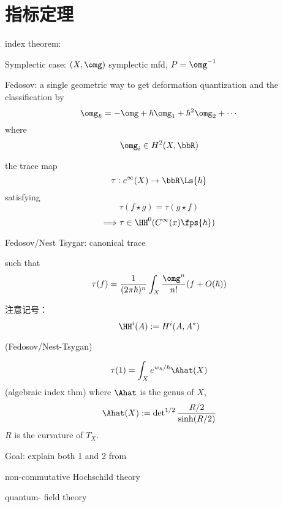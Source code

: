 

\section{指标定理}
index theorem:

Symplectic case: $(X,\omg)$ symplectic mfd,
$P=\omg^{-1}$

Fedosov: a single geometric way
to get deformation quantization and the classification by
$$\omg_{\hbar}=-\omg+\hbar\omg_1+\hbar^2\omg_2+\cdots$$
where
$$\omg_i\in H^2(X,\bbR)$$

\begin{definition}
 the trace map
$$\tau: c^{\infty}(X)\to \bbR\Ls{\hbar}$$
satisfying
$$\tau(f\star g)=\tau(g\star f)$$
$$\Longrightarrow \tau\in \HH^0(C^{\infty}(x)\fps{\hbar})$$

Fedosov/Nest Tsygar: canonical trace

such that
$$\tau(f)=\frac{1}{(2\pi\hbar)^n}
\int_X
  \frac{\omg^n}{n!}
  (f+O(\hbar))$$
\end{definition}

注意记号：
$$\HH^i(A):=H^i(A,A^*)$$


\begin{thm}(Fedosov/Nest-Tsygan)

$$\tau(1)=\int_X e^{w_{\hbar}/\hbar}\Ahat(X)$$
(algebraic index thm)
where $\Ahat$ is the genus of $X$,
$$\Ahat(X):=
\det\nolimits^{1/2}\frac{R/2}{\sinh(R/2)}$$
$R$ is the curvature of $T_X$.
\end{thm}

Goal: explain both 1 and 2 from

non-commutative Hochschild theory

quantum- field theory 